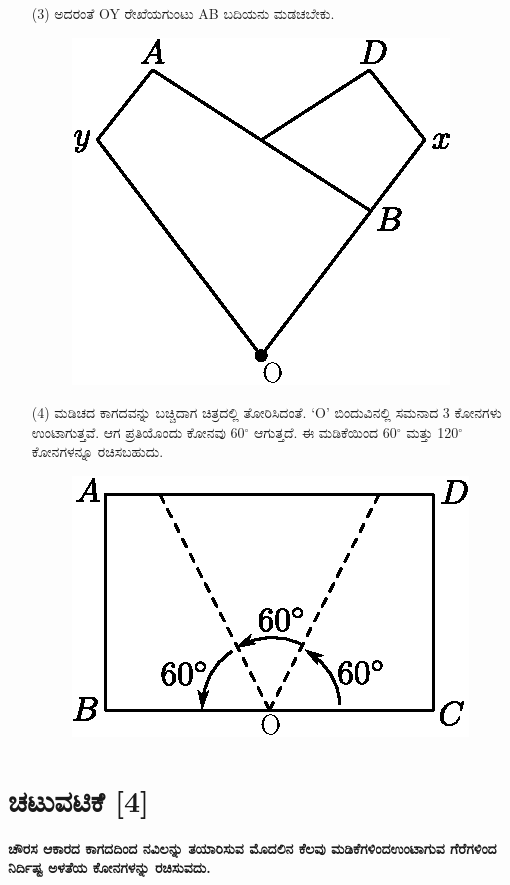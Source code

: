 \begin{enumerate}
\item[(3)] ಅದರಂತೆ OY ರೇಖೆಯಗುಂಟು AB ಬದಿಯನು ಮಡಚಬೇಕು. 
\begin{figure}[H]
\centering
\includegraphics[scale=.98]{src/figure/chap1/fig1-9c.eps}
\end{figure}

\item[(4)] ಮಡಿಚದ ಕಾಗದವನ್ನು ಬಚ್ಚಿದಾಗ  ಚಿತ್ರದಲ್ಲಿ ತೋರಿಸಿದಂತೆ. `O' ಬಿಂದುವಿನಲ್ಲಿ ಸಮನಾದ 3 ಕೋನಗಳು ಉಂಟಾಗುತ್ತವೆ. ಆಗ ಪ್ರತಿಯೊಂದು ಕೋನವು 60$^\circ$ ಆಗುತ್ತದೆ. ಈ ಮಡಿಕೆಯಿಂದ 60$^\circ$ ಮತ್ತು 120$^\circ$ ಕೋನಗಳನ್ನೂ ರಚಿಸಬಹುದು. 
\begin{figure}[H]
\centering
\includegraphics[scale=.98]{src/figure/chap1/fig1-9d.eps}
\end{figure}
\end{enumerate}

\section*{ಚಟುವಟಿಕೆ [4]} \textbf{ಚೌರಸ ಆಕಾರದ ಕಾಗದದಿಂದ ನವಿಲನ್ನು ತಯಾರಿಸುವ ಮೊದಲಿನ ಕೆಲವು ಮಡಿಕೆಗಳಿಂದ\break ಉಂಟಾಗುವ ಗೆರೆಗಳಿಂದ ನಿರ್ದಿಷ್ಟ ಅಳತೆಯ ಕೋನಗಳನ್ನು ರಚಿಸುವದು.} 

